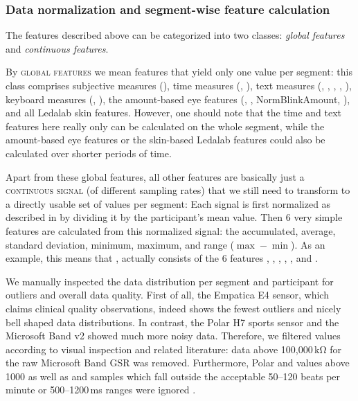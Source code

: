 \documentclass[output=paper]{langsci/langscibook}
\begin{document}

\subsubsection{Data normalization and segment-wise feature calculation}\label{sec:datanorm}\largerpage

The features described above can be categorized into two classes: \textit{global features} and \textit{continuous features}.

By \textsc{global features} we mean features that yield only one value per segment: this class comprises subjective measures (\subjCL{}), time measures (\petime{}, \lnpetime{}), text measures (\bleu{}, \hbleu{}, \ter{}, \hter{}, \sentencelength{}), keyboard measures (\apr{}, \pwr{}), the amount-based eye features (\blinkamount{}, \fixamount{}, Norm\-Blink\-Amount, \normfixamount{}), and all Ledalab skin features. However, one should note that the time and text features here really only can be calculated on the whole segment, while the amount-based eye features or the skin-based Ledalab features could also be calculated over shorter periods of time.

Apart from these global features, all other features are basically just a \textsc{continuous signal} (of different sampling rates) that we still need to transform to a directly usable set of values per segment: Each signal is first normalized as described in \cite{chen2016robust} by dividing it by the participant's mean value. Then 6 very simple features are calculated from this normalized signal: the accumulated, average, standard deviation, minimum, maximum, and range ($\max - \min$). As an example, this means that \gsr{}{}, actually consists of the 6 features , , , , , and .

We manually inspected the data distribution per segment and participant for outliers and overall data quality. First of all, the Empatica E4 sensor, which claims clinical quality observations, indeed shows the fewest outliers and nicely bell shaped data distributions. In contrast, the Polar H7 sports sensor and the Microsoft Band v2 showed much more noisy data. Therefore, we filtered values according to visual inspection and related literature: data above 100,000\,kΩ for the raw Microsoft Band GSR was removed. Furthermore, Polar \rmssd{}{} and \sdnn{}{} values above 1000 \citep{van2018normal} as well as  and  samples which fall outside the acceptable 50--120 beats per minute or 500--1200\,ms ranges were ignored \citep{shaffer2017overview}.
\end{document}
